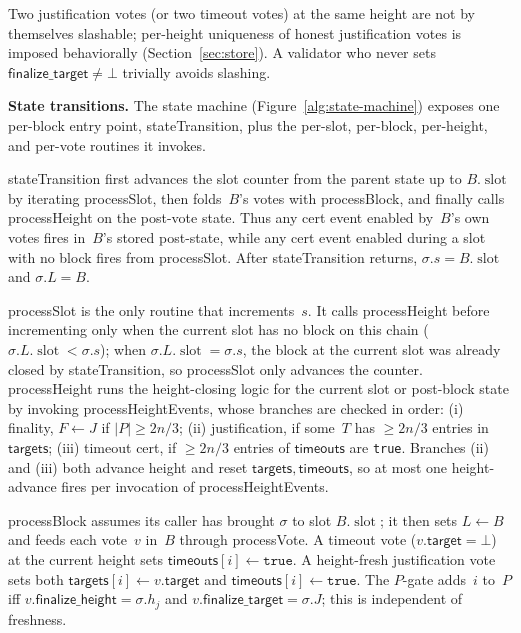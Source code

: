 \documentclass{article}
\newcommand{\slot}[0]{\ensuremath{\operatorname{\mathrm{slot}}}}
\newcommand{\target}{\mathsf{target}}
\newcommand{\finalizeHeight}{\mathsf{finalize\_height}}
\newcommand{\finalizeTarget}{\mathsf{finalize\_target}}
\newcommand{\targets}{\mathsf{targets}}
\newcommand{\timeouts}{\mathsf{timeouts}}
\newcommand{\stateTransition}{\textsf{stateTransition}\xspace}
\newcommand{\processSlot}{\textsf{processSlot}\xspace}
\newcommand{\processBlock}{\textsf{processBlock}\xspace}
\newcommand{\processHeight}{\textsf{processHeight}\xspace}
\newcommand{\processHeightEvents}{\textsf{processHeightEvents}\xspace}
\newcommand{\processVote}{\textsf{processVote}\xspace}
\renewcommand{\paragraph}[1]{\vspace{7pt}\noindent\textbf{#1}}
\theoremstyle{plain}
\theoremstyle{definition}
\theoremstyle{remark}
\begin{document}
Two justification votes (or two timeout votes) at the same height are not by themselves slashable; per-height uniqueness of honest justification votes is imposed behaviorally (Section~\ref{sec:store}).
A validator who never sets $\finalizeTarget \neq \bot$ trivially avoids slashing.

\paragraph{State transitions.}
The state machine (Figure~\ref{alg:state-machine}) exposes one per-block entry point, \stateTransition, plus the per-slot, per-block, per-height, and per-vote routines it invokes.

\stateTransition first advances the slot counter from the parent state up to $B.\slot$ by iterating \processSlot, then folds~$B$'s votes with \processBlock, and finally calls \processHeight on the post-vote state.
Thus any cert event enabled by~$B$'s own votes fires in~$B$'s stored post-state, while any cert event enabled during a slot with no block fires from \processSlot.
After \stateTransition{} returns, $\sigma.s = B.\slot$ and $\sigma.L = B$.

\processSlot is the only routine that increments~$s$.
It calls \processHeight before incrementing only when the current slot has no block on this chain ($\sigma.L.\slot < \sigma.s$); when $\sigma.L.\slot = \sigma.s$, the block at the current slot was already closed by \stateTransition, so \processSlot only advances the counter.
\processHeight runs the height-closing logic for the current slot or post-block state by invoking \processHeightEvents, whose branches are checked in order: (i) finality, $F \gets J$ if $|P| \geq 2n/3$; (ii) justification, if some~$T$ has $\geq 2n/3$ entries in $\targets$; (iii) timeout cert, if $\geq 2n/3$ entries of $\timeouts$ are \texttt{true}.
Branches (ii) and (iii) both advance height and reset $\targets, \timeouts$, so at most one height-advance fires per invocation of \processHeightEvents.

\processBlock assumes its caller has brought $\sigma$ to slot $B.\slot$; it then sets $L \gets B$ and feeds each vote~$v$ in~$B$ through \processVote.
A timeout vote ($v.\target = \bot$) at the current height sets $\timeouts[i] \gets \mathtt{true}$.
A height-fresh justification vote sets both $\targets[i] \gets v.\target$ and $\timeouts[i] \gets \mathtt{true}$.
The $P$-gate adds~$i$ to~$P$ iff $v.\finalizeHeight = \sigma.h_j$ and $v.\finalizeTarget = \sigma.J$; this is independent of freshness.
\end{document}
